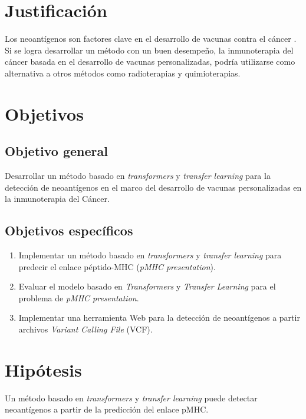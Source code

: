 \documentclass[a4paper]{article}
\begin{document}
\section{Justificación}

Los neoantígenos son factores clave en el desarrollo de vacunas contra el cáncer  \citep{borden2022cancer,chen2021challenges,gopanenko2020main}. Si se logra desarrollar un método con un buen desempeño, la inmunoterapia del cáncer basada en el desarrollo de vacunas personalizadas, podría utilizarse como alternativa a otros métodos como radioterapias y quimioterapias. 



	
\section{Objetivos}
	
	\subsection{Objetivo general}
	
	Desarrollar un método basado en \textit{transformers} y \textit{transfer learning} para la detección de neoantígenos en el marco del desarrollo de vacunas personalizadas en la inmunoterapia del Cáncer.
	
	\subsection{Objetivos específicos}
	\begin{enumerate}
		\item Implementar un método basado en \textit{transformers} y \textit{transfer learning} para predecir el enlace péptido-MHC (\textit{pMHC presentation}).	
		\item Evaluar el modelo basado en \textit{Transformers} y \textit{Transfer Learning} para el problema de \textit{pMHC presentation}.
		\item Implementar una herramienta Web para la detección de neoantígenos a partir archivos \textit{Variant Calling File} (VCF).

		

		
	\end{enumerate}

	
\section{Hipótesis}

Un método basado en \textit{transformers} y \textit{transfer learning} puede detectar neoantígenos a partir de la predicción del enlace pMHC.
\end{document}
